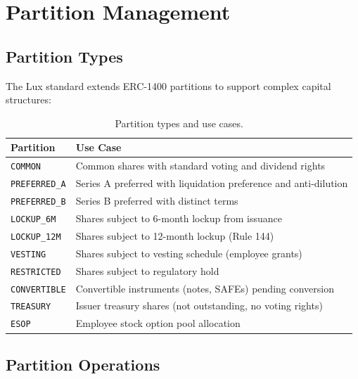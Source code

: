 \section{Partition Management}
\label{sec:partitions}

\subsection{Partition Types}

The Lux standard extends ERC-1400 partitions to support complex capital structures:

\begin{table}[H]
\centering
\caption{Partition types and use cases.}
\label{tab:partitions}
\begin{tabular}{lp{7.5cm}}
\toprule
\textbf{Partition} & \textbf{Use Case} \\
\midrule
\texttt{COMMON} & Common shares with standard voting and dividend rights \\
\texttt{PREFERRED\_A} & Series A preferred with liquidation preference and anti-dilution \\
\texttt{PREFERRED\_B} & Series B preferred with distinct terms \\
\texttt{LOCKUP\_6M} & Shares subject to 6-month lockup from issuance \\
\texttt{LOCKUP\_12M} & Shares subject to 12-month lockup (Rule 144) \\
\texttt{VESTING} & Shares subject to vesting schedule (employee grants) \\
\texttt{RESTRICTED} & Shares subject to regulatory hold \\
\texttt{CONVERTIBLE} & Convertible instruments (notes, SAFEs) pending conversion \\
\texttt{TREASURY} & Issuer treasury shares (not outstanding, no voting rights) \\
\texttt{ESOP} & Employee stock option pool allocation \\
\bottomrule
\end{tabular}
\end{table}

\subsection{Partition Operations}

